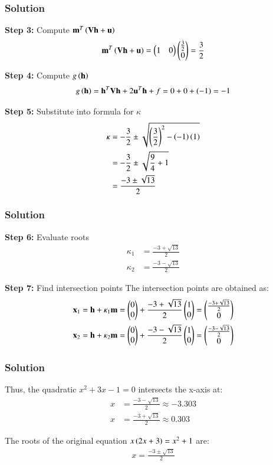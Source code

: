 \documentclass{beamer}
\numberwithin{equation}{section}
\begin{document}
\begin{frame}[fragile]
    \frametitle{Solution}
\textbf{Step 3:} Compute $\mathbf{m}^T\left(\mathbf{V}\mathbf{h} + \mathbf{u}\right)$
\begin{align}
\mathbf{m}^T\left(\mathbf{V}\mathbf{h} + \mathbf{u}\right) = \begin{pmatrix}1 & 0\end{pmatrix}\begin{pmatrix}\frac{3}{2} \\ 0\end{pmatrix} = \frac{3}{2}
\end{align}

\textbf{Step 4:} Compute $g\left(\mathbf{h}\right)$
\begin{align}
g\left(\mathbf{h}\right) = \mathbf{h}^T\mathbf{V}\mathbf{h} + 2\mathbf{u}^T\mathbf{h} + f = 0 + 0 + \left(-1\right) = -1
\end{align}

\textbf{Step 5:} Substitute into formula for $\kappa$
\begin{align}
\kappa &= -\frac{3}{2} \pm \sqrt{\left(\frac{3}{2}\right)^2 - \left(-1\right)\left(1\right)}\\
&= -\frac{3}{2} \pm \sqrt{\frac{9}{4} + 1}\\
&= \frac{-3 \pm \sqrt{13}}{2}
\end{align}

\end{frame}
\begin{frame}[fragile]
    \frametitle{Solution}
\textbf{Step 6:} Evaluate roots
\begin{align}
\kappa_1 &= \frac{-3 + \sqrt{13}}{2}\\
\kappa_2 &= \frac{-3 - \sqrt{13}}{2}
\end{align}

\textbf{Step 7:} Find intersection points
The intersection points are obtained as:
\begin{align}
\mathbf{x}_1 &= \mathbf{h} + \kappa_1\mathbf{m} = \begin{pmatrix}0 \\ 0\end{pmatrix} + \frac{-3 + \sqrt{13}}{2}\begin{pmatrix}1 \\ 0\end{pmatrix} = \begin{pmatrix}\frac{-3 + \sqrt{13}}{2} \\ 0\end{pmatrix}\\
\mathbf{x}_2 &= \mathbf{h} + \kappa_2\mathbf{m} = \begin{pmatrix}0 \\ 0\end{pmatrix} + \frac{-3 - \sqrt{13}}{2}\begin{pmatrix}1 \\ 0\end{pmatrix} = \begin{pmatrix}\frac{-3 - \sqrt{13}}{2} \\ 0\end{pmatrix}
\end{align}

\end{frame}
\begin{frame}[fragile]
    \frametitle{Solution}
Thus, the quadratic $x^2 + 3x - 1 = 0$ intersects the x-axis at:
\begin{align}
x &= \frac{-3 - \sqrt{13}}{2} \approx -3.303\\
x &= \frac{-3 + \sqrt{13}}{2} \approx 0.303
\end{align}

The roots of the original equation $x\left(2x + 3\right) = x^2 + 1$ are:
\begin{align}
\boxed{x = \frac{-3 \pm \sqrt{13}}{2}}
\end{align}
\end{frame}
\end{document}
